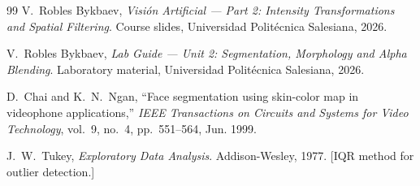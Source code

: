 \documentclass[12pt, a4paper]{article}
\begin{document}
\begin{thebibliography}{99}
V.~Robles Bykbaev,
\textit{Visi\'on Artificial --- Part 2: Intensity Transformations and Spatial Filtering}.
Course slides, Universidad Polit\'ecnica Salesiana, 2026.

V.~Robles Bykbaev,
\textit{Lab Guide --- Unit 2: Segmentation, Morphology and Alpha Blending}.
Laboratory material, Universidad Polit\'ecnica Salesiana, 2026.

D.~Chai and K.~N.~Ngan,
``Face segmentation using skin-color map in videophone applications,''
\textit{IEEE Transactions on Circuits and Systems for Video Technology},
vol.~9, no.~4, pp.~551--564, Jun. 1999.

J.~W.~Tukey,
\textit{Exploratory Data Analysis}.
Addison-Wesley, 1977.
[IQR method for outlier detection.]

\end{thebibliography}
\end{document}
